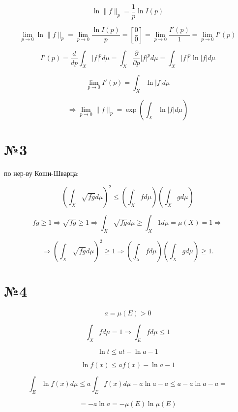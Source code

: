 \documentclass{article}
\begin{document}
\[
\ln \|f\|_p = \frac{1}{p} \ln I(p)
\]

\[
\lim_{p \to 0} \ln \|f\|_p = \lim_{p \to 0} \frac{\ln I(p)}{p} = \left[ \frac{0}{0} \right] = \lim_{p \to 0} \frac{I'(p)}{1} = \lim_{p \to 0} I'(p)
\]

\[
I'(p) = \frac{d}{dp} \int_X |f|^p d\mu = \int_X \frac{\partial}{\partial p} |f|^p d\mu = \int_X |f|^p \ln |f| d\mu
\]

\[
\lim_{p \to 0} I'(p) = \int_X \ln |f| d\mu
\]

\[
\Rightarrow \lim_{p \to 0} \|f\|_p = \exp\left( \int_X \ln |f| d\mu \right)
\]

\section*{№3}

по нер-ву Коши-Шварца:

\[
\left( \int_X \sqrt{fg} d\mu \right)^2 \le \left( \int_X f d\mu \right) \left( \int_X g d\mu \right)
\]

\[
fg \ge 1 \Rightarrow \sqrt{fg} \ge 1 \Rightarrow \int_X \sqrt{fg} d\mu \ge \int_X 1 d\mu = \mu(X) = 1 \Rightarrow
\]

\[
\Rightarrow \left( \int_X \sqrt{fg} d\mu \right)^2 \ge 1 \Rightarrow \left( \int_X f d\mu \right) \left( \int_X g d\mu \right) \ge 1.
\]

\section*{№4}

\[
a = \mu(E) > 0
\]

\[
\int_X f d\mu = 1 \Rightarrow \int_E f d\mu \le 1
\]

\[
\ln t \le a t - \ln a - 1
\]

\[
\ln f(x) \le a f(x) - \ln a - 1
\]

\[
\int_E \ln f(x) d\mu \le a \int_E f(x) d\mu - a \ln a - a \le a - a \ln a - a =
\]

\[
= -a \ln a = -\mu(E) \ln \mu(E)
\]
\end{document}
